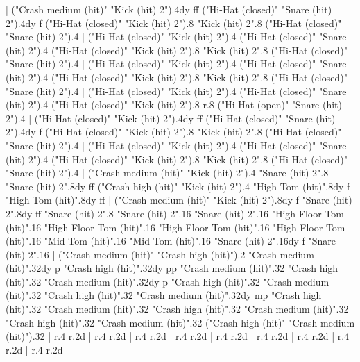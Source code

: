     |
      ("Crash medium (hit)" "Kick (hit) 2").4{dy ff}
      ("Hi-Hat (closed)" "Snare (hit) 2").4{dy f}
      ("Hi-Hat (closed)" "Kick (hit) 2").8
      "Kick (hit) 2".8
      ("Hi-Hat (closed)" "Snare (hit) 2").4
    |
      ("Hi-Hat (closed)" "Kick (hit) 2").4
      ("Hi-Hat (closed)" "Snare (hit) 2").4
      ("Hi-Hat (closed)" "Kick (hit) 2").8
      "Kick (hit) 2".8
      ("Hi-Hat (closed)" "Snare (hit) 2").4
    |
      ("Hi-Hat (closed)" "Kick (hit) 2").4
      ("Hi-Hat (closed)" "Snare (hit) 2").4
      ("Hi-Hat (closed)" "Kick (hit) 2").8
      "Kick (hit) 2".8
      ("Hi-Hat (closed)" "Snare (hit) 2").4
    |
      ("Hi-Hat (closed)" "Kick (hit) 2").4
      ("Hi-Hat (closed)" "Snare (hit) 2").4
      ("Hi-Hat (closed)" "Kick (hit) 2").8
      r.8
      ("Hi-Hat (open)" "Snare (hit) 2").4
    |
      ("Hi-Hat (closed)" "Kick (hit) 2").4{dy ff}
      ("Hi-Hat (closed)" "Snare (hit) 2").4{dy f}
      ("Hi-Hat (closed)" "Kick (hit) 2").8
      "Kick (hit) 2".8
      ("Hi-Hat (closed)" "Snare (hit) 2").4
    |
      ("Hi-Hat (closed)" "Kick (hit) 2").4
      ("Hi-Hat (closed)" "Snare (hit) 2").4
      ("Hi-Hat (closed)" "Kick (hit) 2").8
      "Kick (hit) 2".8
      ("Hi-Hat (closed)" "Snare (hit) 2").4
    |
      ("Crash medium (hit)" "Kick (hit) 2").4
      "Snare (hit) 2".8
      "Snare (hit) 2".8{dy ff}
      ("Crash high (hit)" "Kick (hit) 2").4
      "High Tom (hit)".8{dy f}
      "High Tom (hit)".8{dy ff}
    |
      ("Crash medium (hit)" "Kick (hit) 2").8{dy f}
      "Snare (hit) 2".8{dy ff}
      "Snare (hit) 2".8
      "Snare (hit) 2".16
      "Snare (hit) 2".16
      "High Floor Tom (hit)".16
      "High Floor Tom (hit)".16
      "High Floor Tom (hit)".16
      "High Floor Tom (hit)".16
      "Mid Tom (hit)".16
      "Mid Tom (hit)".16
      "Snare (hit) 2".16{dy f}
      "Snare (hit) 2".16
    |
      ("Crash medium (hit)" "Crash high (hit)").2
      "Crash medium (hit)".32{dy p}
      "Crash high (hit)".32{dy pp}
      "Crash medium (hit)".32
      "Crash high (hit)".32
      "Crash medium (hit)".32{dy p}
      "Crash high (hit)".32
      "Crash medium (hit)".32
      "Crash high (hit)".32
      "Crash medium (hit)".32{dy mp}
      "Crash high (hit)".32
      "Crash medium (hit)".32
      "Crash high (hit)".32
      "Crash medium (hit)".32
      "Crash high (hit)".32
      "Crash medium (hit)".32
      ("Crash high (hit)" "Crash medium (hit)").32
    |
      r.4
      r.2{d}
    |
      r.4
      r.2{d}
    |
      r.4
      r.2{d}
    |
      r.4
      r.2{d}
    |
      r.4
      r.2{d}
    |
      r.4
      r.2{d}
    |
      r.4
      r.2{d}
    |
      r.4
      r.2{d}
    |
      r.4
      r.2{d}

